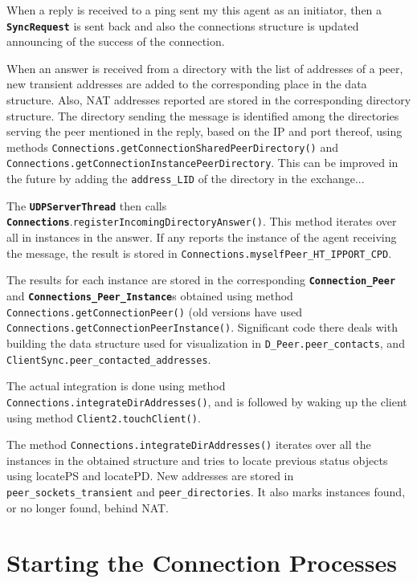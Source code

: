 \documentclass{book}
\newcommand{\cls}[1]{{\tt\bf #1}}
\newcommand{\mth}[1]{{\tt #1}}
\newcommand{\mmb}[1]{{\tt #1}}
\begin{document}
When a reply is received to a ping sent my this agent as an initiator, then a \cls{SyncRequest} is sent back and 
also the connections structure is updated announcing of the success of the connection.

When an answer is received from a directory with the list of addresses of a peer, new transient addresses are added to the
corresponding place in the data structure. Also, NAT addresses reported are stored in the corresponding directory structure.
The directory sending the message is identified among the directories serving the peer mentioned in the reply, based on the
IP and port thereof, using methods \mth{Connections.getConnectionSharedPeerDirectory()} and \mth{Connections.getConnectionInstancePeerDirectory}. This can be improved in the future by adding the \mmb{address\_LID} of the directory in the exchange...

The \cls{UDPServerThread} then calls \cls{Connections}.\mth{registerIncomingDirectoryAnswer()}.
This method iterates over all in instances in the answer. If any reports the instance of the agent receiving the message,
the result is stored in \mth{Connections.myselfPeer\_HT\_IPPORT\_CPD}.

The results for each instance are stored in the corresponding \cls{Connection\_Peer} and \cls{Connections\_Peer\_Instance}s
obtained using method \mth{Connections.getConnectionPeer()} (old versions have used \mth{Connections.getConnectionPeerInstance()}. 
Significant code there deals with building the data structure used for visualization in \mmb{D\_Peer.peer\_contacts},
and \mmb{ClientSync.peer\_contacted\_addresses}.

The actual integration is done using method \mth{Connections.integrateDirAddresses()}, and is followed by waking up
the client using method \mth{Client2.touchClient()}.

The method \mth{Connections.integrateDirAddresses()} iterates over all the instances in the obtained structure and
tries to locate previous status objects using locatePS and locatePD. New addresses are stored in \mmb{peer\_sockets\_transient}
and \mmb{peer\_directories}. It also marks instances found, or no longer found, behind NAT.

\section{Starting the Connection Processes}
\end{document}
